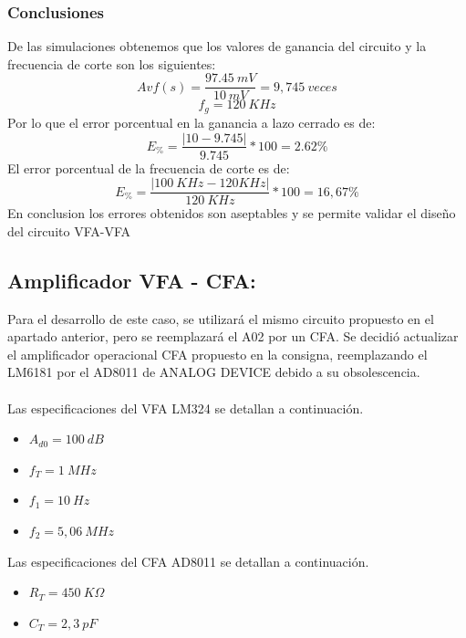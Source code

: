 \documentclass[a4paper,12pt]{article}
\begin{document}
\subsubsection{Conclusiones}
\vspace{0.2cm}
\hspace{1mm}De las simulaciones obtenemos que los valores de ganancia del circuito y la frecuencia de corte son los siguientes:
\begin{equation}
    {Avf(s)=\frac{97.45~mV}{10~mV}}=9,745~veces
\end{equation}
\begin{equation}
f_g=120~KHz
\end{equation}
\vspace{0,2cm}
\hspace{1mm}Por lo que el error porcentual en la ganancia a lazo cerrado es de:
\begin{equation}
    E_\%=\frac{|10-9.745|}{9.745}*100=2.62\%
\end{equation}
\hspace{1mm}El error porcentual de la frecuencia de corte es de:
\begin{equation}
    E_\%=\frac{|100~KHz-120KHz|}{120~KHz}*100=16,67\%
\end{equation}
\vspace{0,2cm}
\hspace{1mm}En conclusion los errores obtenidos son aseptables y se permite validar el diseño del circuito VFA-VFA
\newpage
\subsection{Amplificador VFA - CFA:}
\vspace{0,2cm}
\hspace{1mm}Para el desarrollo de este caso, se utilizar\'a el mismo circuito propuesto en el apartado anterior, pero se reemplazar\'a el A02 por un CFA. Se decidi\'o actualizar el amplificador operacional CFA propuesto en la consigna, reemplazando el LM6181 por el AD8011 de ANALOG DEVICE debido a su obsolescencia.\\\\
\hspace{1mm}Las especificaciones del VFA LM324 se detallan a continuaci\'on.

\begin{itemize}
    \item $A_{d0}=100~dB$
    \item $f_T=1~MHz$
    \item $f_1=10~Hz$
    \item $f_2=5,06~MHz$
\end{itemize}
\vspace{0,2cm}
\hspace{1mm}Las especificaciones del CFA AD8011 se detallan a continuaci\'on.
\begin{itemize}
    \item $R_T=450~K\Omega$
    \item $C_T=2,3~pF$
\end{itemize}
\end{document}
